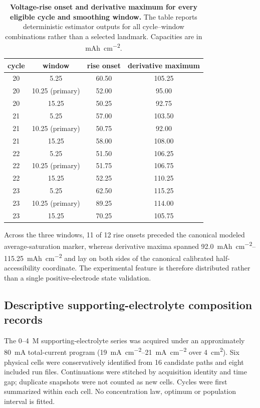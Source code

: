 \documentclass[11pt]{article}
\let\SIorigsubsection\subsection
\renewcommand{\subsection}{\FloatBarrier\SIorigsubsection}
\begin{document}
\begin{table}[!htbp]
\centering\small
\caption{\textbf{Voltage-rise onset and derivative maximum for every eligible cycle and smoothing window.}
The table reports deterministic estimator outputs for all cycle--window combinations rather than a selected
landmark. Capacities are in \si{mAh.cm^{-2}}.}
\label{tab:derivative-landmarks}
\begin{tabular}{cccc}
\toprule
cycle & window & rise onset & derivative maximum\\
\midrule
20 & 5.25 & 60.50 & 105.25\\
20 & 10.25 (primary) & 52.00 & 95.00\\
20 & 15.25 & 50.25 & 92.75\\
21 & 5.25 & 57.00 & 103.50\\
21 & 10.25 (primary) & 50.75 & 92.00\\
21 & 15.25 & 58.00 & 108.00\\
22 & 5.25 & 51.50 & 106.25\\
22 & 10.25 (primary) & 51.75 & 106.75\\
22 & 15.25 & 52.25 & 110.25\\
23 & 5.25 & 62.50 & 115.25\\
23 & 10.25 (primary) & 89.25 & 114.00\\
23 & 15.25 & 70.25 & 105.75\\
\bottomrule
\end{tabular}
\end{table}

Across the three windows, 11 of 12 rise onsets preceded the canonical modeled average-saturation marker,
whereas derivative maxima spanned \SIrange{92.0}{115.25}{mAh.cm^{-2}} and lay on both sides of the canonical
calibrated half-accessibility coordinate. The experimental feature is therefore distributed rather than a
single positive-electrode state validation.

\subsection{Descriptive supporting-electrolyte composition records}

The 0--4~M supporting-electrolyte series was acquired under an approximately \SI{80}{mA} total-current
program (\SIrange{19}{21}{mA.cm^{-2}} over \SI{4}{cm^2}). Six physical cells were conservatively identified
from 16 candidate paths and eight included run files. Continuations were stitched by acquisition identity and
time gap; duplicate snapshots were not counted as new cells. Cycles were first summarized within each cell.
No concentration law, optimum or population interval is fitted.
\end{document}

